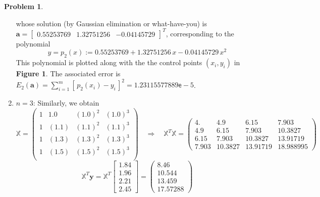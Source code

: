 \documentclass[10pt]{article}
\theoremstyle{plain}
\theoremstyle{definition}
\newtheorem{prob}{Problem}
\numberwithin{equation}{section}
\begin{document}
\begin{prob}
\begin{enumerate}[\bfseries(a)]
    whose solution (by Gaussian elimination or what-have-you) is
    $\bm{a} = \begin{bmatrix} 0.55253769  & 1.32751256 & -0.04145729\end{bmatrix}^T$,
    corresponding to the polynomial
    \[
            \boxed{y = p_2(x) := 0.55253769 + 1.32751256 \,x - 0.04145729\, x^2}
        \]
        This polynomial is plotted along with the the control points $(x_i, y_i)$
        in \textbf{Figure 1}.
        The associated error is
        $E_2(\bm{a}) = \sum_{i=1}^m \left[\, p_2(x_i) - y_i\, \right]^2 = 1.23115577889\mathsf{e}-5$.
\item $n=3$:
    Similarly, we obtain 
    \[
            \mathbb{X} = \begin{pmatrix}
                1 & 1.0 & (1.0)^2  & (1.0)^3\\
                1 & (1.1) & (1.1)^2 & (1.1)^3\\
                1 & (1.3) & (1.3)^2 & (1.3)^3\\
                1 & (1.5) & (1.5)^2 & (1.5)^3\\
            \end{pmatrix}
            \quad \Longrightarrow \quad
            \mathbb{X}^T\mathbb{X} = 
        \begin{pmatrix}
        4.      &   4.9     &   6.15    &   7.903   \\
        4.9     &   6.15    &   7.903   &  10.3827  \\
        6.15    &   7.903   &  10.3827  &  13.91719 \\
        7.903   &  10.3827  &  13.91719 &  18.988995
        \end{pmatrix}
            \]
    \[
        \mathbb{X}^T \bm{y} = \mathbb{X}^T \begin{bmatrix} 1.84 \\ 1.96 \\ 2.21 \\ 2.45 \end{bmatrix}
        = \begin{pmatrix}8.46 \\  10.544 \\  13.459 \\ 17.57288 \end{pmatrix}
        \]

\end{enumerate}
\end{prob}
\end{document}
